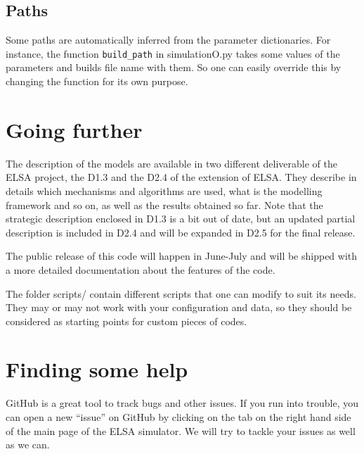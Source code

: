 \documentclass[12pt]{article}
\begin{document}
\subsection{Paths}
Some paths are automatically inferred from the parameter dictionaries. For instance, the function \verb|build_path| in simulationO.py takes some values of the parameters and builds file name with them. So one can easily override this by changing the function for its own purpose.


\section{Going further}

The description of the models are available in two different deliverable of the ELSA project, the D1.3 and the D2.4 of the extension of ELSA. They describe in details which mechanisms and algorithms are used, what is the modelling framework and so on, as well as the results obtained so far. Note that the strategic description enclosed in D1.3 is a bit out of date, but an updated partial description is included in D2.4 and will be expanded in D2.5 for the final release.

The public release of this code will happen in June-July and will be shipped with a more detailed documentation about the features of the code.

The folder scripts/ contain different scripts that one can modify to suit its needs. They may or may not work with your configuration and data, so they should be considered as starting points for custom pieces of codes.


\section*{Finding some help}
GitHub is a great tool to track bugs and other issues. If you run into trouble, you can open a new ``issue'' on GitHub by clicking on the tab on the right hand side of the main page of the ELSA simulator. We will try to tackle your issues as well as we can.
\end{document}
